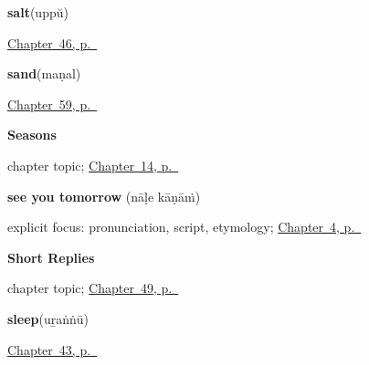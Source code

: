 \noindent\begin{minipage}[t]{\linewidth}
\raggedright
\textbf{salt}\enspace\emph{}\enspace(uppŭ)\par
\footnotesize \hyperref[ch:ml-ask-for]{Chapter~46, p.~\pageref*{ch:ml-ask-for}}
\end{minipage}\par\smallskip

\noindent\begin{minipage}[t]{\linewidth}
\raggedright
\textbf{sand}\enspace\emph{}\enspace(maṇal)\par
\footnotesize \hyperref[ch:ml-what-the-air-carries]{Chapter~59, p.~\pageref*{ch:ml-what-the-air-carries}}
\end{minipage}\par\smallskip

\noindent\begin{minipage}[t]{\linewidth}
\raggedright
\textbf{Seasons}\par
\footnotesize chapter topic; \hyperref[ch:ml-seasons]{Chapter~14, p.~\pageref*{ch:ml-seasons}}
\end{minipage}\par\smallskip

\noindent\begin{minipage}[t]{\linewidth}
\raggedright
\textbf{see you tomorrow}\enspace\emph{ }\enspace(nāḷe kāṇāṁ)\par
\footnotesize explicit focus: pronunciation, script, etymology; \hyperref[ch:farewells]{Chapter~4, p.~\pageref*{ch:farewells}}
\end{minipage}\par\smallskip

\noindent\begin{minipage}[t]{\linewidth}
\raggedright
\textbf{Short Replies}\par
\footnotesize chapter topic; \hyperref[ch:ml-replies]{Chapter~49, p.~\pageref*{ch:ml-replies}}
\end{minipage}\par\smallskip

\noindent\begin{minipage}[t]{\linewidth}
\raggedright
\textbf{sleep}\enspace\emph{}\enspace(uṟaṅṅū)\par
\footnotesize \hyperref[ch:ml-more-verbs]{Chapter~43, p.~\pageref*{ch:ml-more-verbs}}
\end{minipage}\par\smallskip


